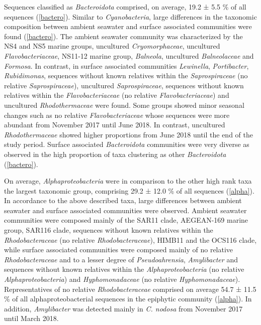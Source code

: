 \documentclass[
  12pt,
]{article}
\begin{document}
Sequences classified as \emph{Bacteroidota} comprised, on average, 19.2
± 5.5 \si{\percent} of all sequences (\autoref{bactero}). Similar to
\emph{Cyanobacteria}, large differences in the taxonomic composition
between ambient seawater and surface associated communities were found
(\autoref{bactero}). The ambient seawater community was characterized by
the NS4 and NS5 marine groups, uncultured \emph{Cryomorphaceae},
uncultured \emph{Flavobacteriaceae}, NS11-12 marine group,
\emph{Balneola}, uncultured \emph{Balneolaceae} and \emph{Formosa}. In
contrast, in surface associated communities \emph{Lewinella},
\emph{Portibacter}, \emph{Rubidimonas}, sequences without known
relatives within the \emph{Saprospiraceae} (no relative
\emph{Saprospiraceae}), uncultured \emph{Saprospiraceae}, sequences
without known relatives within the \emph{Flavobacteriaceae} (no relative
\emph{Flavobacteriaceae}) and uncultured \emph{Rhodothermaceae} were
found. Some groups showed minor seasonal changes such as no relative
\emph{Flavobacteriaceae} whose sequences were more abundant from
November 2017 until June 2018. In contrast, uncultured
\emph{Rhodothermaceae} showed higher proportions from June 2018 until
the end of the study period. Surface associated \emph{Bacteroidota}
communities were very diverse as observed in the high proportion of taxa
clustering as other \emph{Bacteroidota} (\autoref{bactero}).

On average, \emph{Alphaproteobacteria} were in comparison to the other
high rank taxa the largest taxonomic group, comprising 29.2 ± 12.0
\si{\percent} of all sequences (\autoref{alpha}). In accordance to the
above described taxa, large differences between ambient seawater and
surface associated communities were observed. Ambient seawater
communities were composed mainly of the SAR11 clade, AEGEAN-169 marine
group, SAR116 clade, sequences without known relatives within the
\emph{Rhodobacteraceae} (no relative \emph{Rhodobacteraceae}), HIMB11
and the OCS116 clade, while surface associated communities were composed
mainly of no relative \emph{Rhodobacteraceae} and to a lesser degree of
\emph{Pseudoahrensia}, \emph{Amylibacter} and sequences without known
relatives within the \emph{Alphaproteobacteria} (no relative
\emph{Alphaproteobacteria}) and \emph{Hyphomonadaceae} (no relative
\emph{Hyphomonadaceae}). Representatives of no relative
\emph{Rhodobacteraceae} comprised on average 54.7 ± 11.5 \si{\percent}
of all alphaproteobacterial sequences in the epiphytic community
(\autoref{alpha}). In addition, \emph{Amylibacter} was detected mainly
in \emph{C. nodosa} from November 2017 until March 2018.
\end{document}
